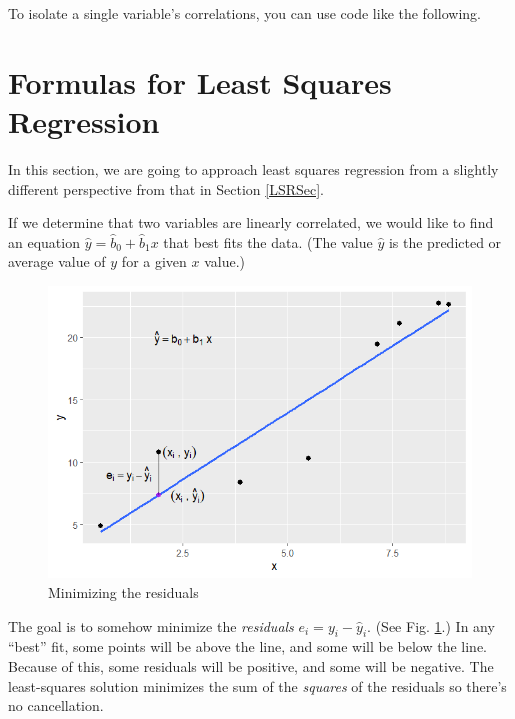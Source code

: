 \documentclass[
]{book}
\newenvironment{Shaded}{\begin{snugshade}}{\end{snugshade}}
\newcommand{\FunctionTok}[1]{\textcolor[rgb]{0.13,0.29,0.53}{\textbf{#1}}}
\newcommand{\NormalTok}[1]{#1}
\newcommand{\SpecialCharTok}[1]{\textcolor[rgb]{0.81,0.36,0.00}{\textbf{#1}}}
\theoremstyle{definition}
\theoremstyle{definition}
\theoremstyle{definition}
\theoremstyle{definition}
\theoremstyle{remark}
\begin{document}
To isolate a single variable's correlations, you can use code like the following.

\begin{Shaded}
\end{Shaded}

\section{Formulas for Least Squares Regression}\label{formulas-for-least-squares-regression}

In this section, we are going to approach least squares regression from a slightly different perspective from that in Section \ref{LSRSec}.

If we determine that two variables are linearly correlated, we would like to find an equation \(\hat{y}=\hat{b}_0+\hat{b}_1x\) that best fits the data. (The value \(\hat{y}\) is the predicted or average value of \(y\) for a given \(x\) value.)

\begin{figure}

{\centering \includegraphics[width=0.7\linewidth]{images/residuals} 

}

\caption{Minimizing the residuals}\label{fig:residuals}
\end{figure}

The goal is to somehow minimize the \emph{residuals} \(e_i=y_i-\hat{y}_i.\) (See Fig. \ref{fig:residuals}.) In any ``best'' fit, some points will be above the line, and some will be below the line. Because of this, some residuals will be positive, and some will be negative. The least-squares solution minimizes the sum of the \emph{squares} of the residuals so there's no cancellation.
\end{document}
